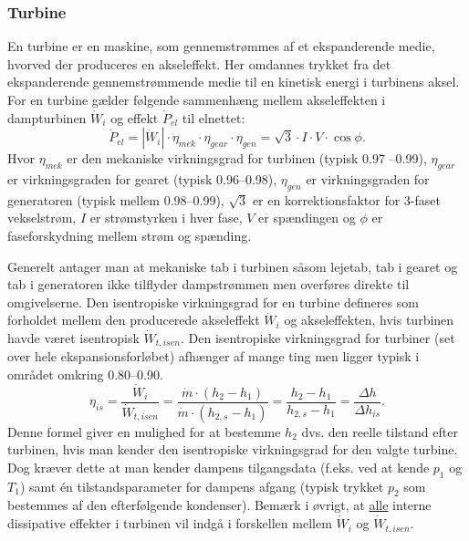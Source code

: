 \subsubsection{Turbine}
En turbine er en maskine, som gennemstrømmes af et ekspanderende medie, hvorved der produceres en akseleffekt. Her omdannes trykket fra det ekspanderende gennemstrømmende medie til en kinetisk energi i turbinens aksel. For en turbine gælder følgende sammenhæng mellem akseleffekten i dampturbinen $\dot{W}_i$ og effekt $\dot{P}_{el}$ til elnettet:
\[ 
\dot{P}_{el} = \left| \dot{W}_i \right| \cdot \eta_{mek} \cdot \eta_{gear} \cdot \eta_{gen} = \sqrt{3} \cdot I \cdot V \cdot \cos\phi
.\]
Hvor $\eta_{mek}$ er den mekaniske virkningsgrad for turbinen (typisk \num{0,97} --\num{0,99}), $\eta_{gear}$ er virkningsgraden for gearet (typisk \num{0,96}--\num{0,98}), $\eta_{gen}$ er virkningsgraden for generatoren (typisk mellem \num{0,98}--\num{0,99}), $\sqrt{3}$ er en korrektionsfaktor for 3-faset vekselstrøm, $I$ er strømstyrken i hver fase, $V$ er spændingen og $\phi$ er faseforskydning mellem strøm og spænding.

Generelt antager man at mekaniske tab i turbinen såsom lejetab, tab i gearet og tab i generatoren ikke tilflyder dampstrømmen men overføres direkte til omgivelserne. Den isentropiske virkningsgrad for en turbine defineres som forholdet mellem den producerede akseleffekt $\dot{W}_i$ og akseleffekten, hvis turbinen havde været isentropisk $\dot{W}_{t, isen}$. Den isentropiske virkningsgrad for turbiner (set over hele ekspansionsforløbet) afhænger af mange ting men ligger typisk i området omkring \num{0,80}--\num{0,90}.
\[ 
\eta_{is} = \frac{\dot{W}_i}{\dot{W}_{t,isen}} = \frac{\dot{m} \cdot (h_2 - h_1)}{\dot{m} \cdot (h_{2,s} - h_1)} = \frac{h_2 - h_1}{h_{2,s} - h_1} = \frac{\Delta h}{\Delta h_{is}}
.\]
Denne formel giver en mulighed for at bestemme $h_2$ dvs. den reelle tilstand efter turbinen, hvis man kender den isentropiske virkningsgrad for den valgte turbine. Dog kræver dette at man kender dampens tilgangsdata (f.eks. ved at kende $p_1$ og $T_1$) samt én tilstandsparameter for dampens afgang (typisk trykket $p_2$ som bestemmes af den efterfølgende kondenser). Bemærk i øvrigt, at \underline{alle} interne dissipative effekter i turbinen vil indgå i forskellen mellem $\dot{W}_i$ og $\dot{W}_{t,isen}$.


